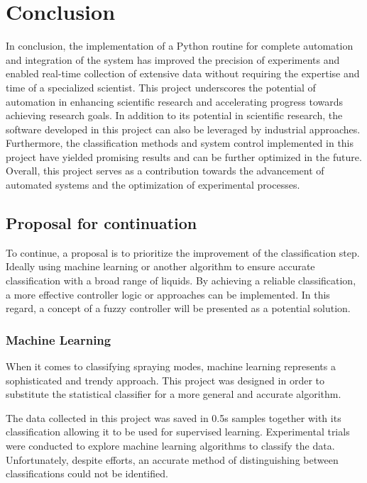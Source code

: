 \chapter{Conclusion}
\label{chap:conclusion}

In conclusion, the implementation of a Python routine for complete automation and integration of the system has improved the precision of experiments and enabled real-time collection of extensive data without requiring the expertise and time of a specialized scientist. 
This project underscores the potential of automation in enhancing scientific research and accelerating progress towards achieving research goals.
In addition to its potential in scientific research, the software developed in this project can also be leveraged by industrial approaches. 
Furthermore, the classification methods and system control implemented in this project have yielded promising results and can be further optimized in the future. Overall, this project serves as a contribution towards the advancement of automated systems and the optimization of experimental processes.

\section{Proposal for continuation}

To continue, a proposal is to prioritize the improvement of the classification step. 
Ideally using machine learning or another algorithm to ensure accurate classification with a broad range of liquids.
By achieving a reliable classification, a more effective controller logic or approaches can be implemented. 
In this regard, a concept of a fuzzy controller will be presented as a potential solution.

\subsection{Machine Learning}

    When it comes to classifying spraying modes, machine learning represents a sophisticated and trendy approach.
    This project was designed in order to substitute the statistical classifier for a more general and accurate algorithm.
    
    The data collected in this project was saved in 0.5s samples together with its classification allowing it to be used for supervised learning.
    Experimental trials were conducted to explore machine learning algorithms to classify the data. Unfortunately, despite efforts, an accurate method of distinguishing between classifications could not be identified.

